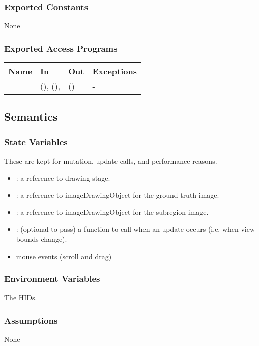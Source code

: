 \documentclass[12pt, titlepage]{article}
\begin{document}
\subsubsection{Exported Constants}
None
\subsubsection{Exported Access Programs}

\begin{center}
\begin{tabular}{L{5cm} L{4cm} L{4cm} L{2cm}}
\hline
\textbf{Name} & \textbf{In} & \textbf{Out} & \textbf{Exceptions} \\
\hline
{} &  (),
   (), 
  &  () & - \\
\hline
\end{tabular}
\end{center}

\subsection{Semantics}

\subsubsection{State Variables}
These are kept for mutation, update calls, and performance reasons.
\begin{itemize}
  \item {}: a reference to drawing stage.
  \item {}: a reference to imageDrawingObject for the ground truth image.
  \item {}: a reference to imageDrawingObject for the subregion image.
  \item {}: (optional to pass) a function to call when an update occurs
    (i.e. when view bounds change).
  \item mouse events (scroll and drag)
\end{itemize}

\subsubsection{Environment Variables}
The HIDs.

\subsubsection{Assumptions}
None
\end{document}
